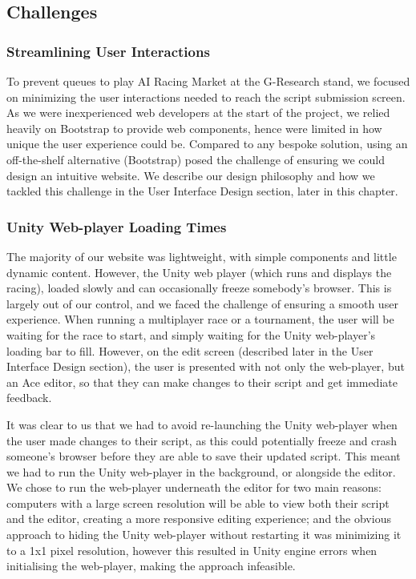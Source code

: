 \subsection{Challenges}

\subsubsection{Streamlining User Interactions}

To prevent queues to play AI Racing Market at the G-Research stand, we focused on minimizing the user interactions needed to reach the script submission screen. As we were inexperienced web developers at the start of the project, we relied heavily on Bootstrap to provide web components, hence were limited in how unique the user experience could be. Compared to any bespoke solution, using an off-the-shelf alternative (Bootstrap) posed the challenge of ensuring we could design an intuitive website. We describe our design philosophy and how we tackled this challenge in the User Interface Design section, later in this chapter.

\subsubsection{Unity Web-player Loading Times}

The majority of our website was lightweight, with simple components and little dynamic content. However, the Unity web player (which runs and displays the racing), loaded slowly and can occasionally freeze somebody's browser. This is largely out of our control, and we faced the challenge of ensuring a smooth user experience. When running a multiplayer race or a tournament, the user will be waiting for the race to start, and simply waiting for the Unity web-player's loading bar to fill. However, on the edit screen (described later in the User Interface Design section), the user is presented with not only the web-player, but an Ace editor, so that they can make changes to their script and get immediate feedback. 

It was clear to us that we had to avoid re-launching the Unity web-player when the user made changes to their script, as this could potentially freeze and crash someone's browser before they are able to save their updated script. This meant we had to run the Unity web-player in the background, or alongside the editor. We chose to run the web-player underneath the editor for two main reasons: computers with a large screen resolution will be able to view both their script and the editor, creating a more responsive editing experience; and the obvious approach to hiding the Unity web-player without restarting it was minimizing it to a 1x1 pixel resolution, however this resulted in Unity engine errors when initialising the web-player, making the approach infeasible. 

